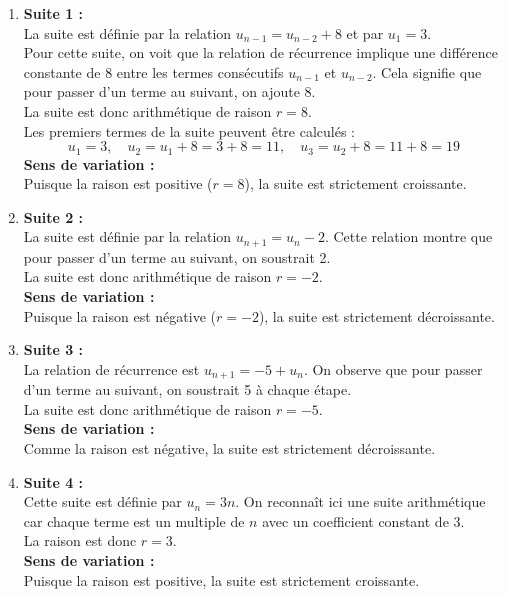 \documentclass[a4paper,12pt]{article}
\begin{document}
    \begin{enumerate}
        \item \textbf{Suite 1 :} \\
        La suite est définie par la relation $u_{n-1} = u_{n-2} + 8$ et par $u_1 = 3$. \\
        Pour cette suite, on voit que la relation de récurrence implique une différence constante de 8 entre les termes consécutifs $u_{n-1}$ et $u_{n-2}$. Cela signifie que pour passer d'un terme au suivant, on ajoute 8. \\
        La suite est donc arithmétique de raison $r = 8$. \\
        Les premiers termes de la suite peuvent être calculés :
        \[
        u_1 = 3, \quad u_2 = u_1 + 8 = 3 + 8 = 11, \quad u_3 = u_2 + 8 = 11 + 8 = 19
        \]
        \textbf{Sens de variation :} \\
        Puisque la raison est positive ($r = 8$), la suite est strictement croissante.
    
        \item \textbf{Suite 2 :} \\
        La suite est définie par la relation $u_{n+1} = u_n - 2$. Cette relation montre que pour passer d'un terme au suivant, on soustrait 2. \\
        La suite est donc arithmétique de raison $r = -2$. \\
        \textbf{Sens de variation :} \\
        Puisque la raison est négative ($r = -2$), la suite est strictement décroissante.
    
        \item \textbf{Suite 3 :} \\
        La relation de récurrence est $u_{n+1} = -5 + u_n$. On observe que pour passer d’un terme au suivant, on soustrait 5 à chaque étape. \\
        La suite est donc arithmétique de raison $r = -5$. \\
        \textbf{Sens de variation :} \\
        Comme la raison est négative, la suite est strictement décroissante.
    
        \item \textbf{Suite 4 :} \\
        Cette suite est définie par $u_n = 3n$. On reconnaît ici une suite arithmétique car chaque terme est un multiple de $n$ avec un coefficient constant de 3. \\
        La raison est donc $r = 3$. \\
        \textbf{Sens de variation :} \\
        Puisque la raison est positive, la suite est strictement croissante.
    

\end{enumerate}
\end{document}
